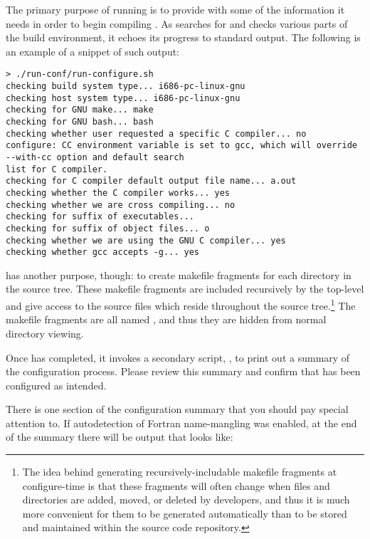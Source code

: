 The primary purpose of running \configure is to provide \make with some of
the information it needs in order to begin compiling \libflamens.
As \configure searches for and checks various parts of the build environment,
it echoes its progress to standard output.
The following is an example of a snippet of such output:

\begin{Verbatim}[frame=single,framesep=2.5mm,xleftmargin=5mm,commandchars=\\\{\},fontsize=\footnotesize]
> ./run-conf/run-configure.sh 
checking build system type... i686-pc-linux-gnu
checking host system type... i686-pc-linux-gnu
checking for GNU make... make
checking for GNU bash... bash
checking whether user requested a specific C compiler... no
configure: CC environment variable is set to gcc, which will override --with-cc option and default search
list for C compiler.
checking for C compiler default output file name... a.out
checking whether the C compiler works... yes
checking whether we are cross compiling... no
checking for suffix of executables... 
checking for suffix of object files... o
checking whether we are using the GNU C compiler... yes
checking whether gcc accepts -g... yes
\end{Verbatim}

\configure has another purpose, though: to create makefile fragments for each
directory in the source tree.
These makefile fragments are included recursively by the top-level \makefile
and give \make access to the source files which reside throughout the source
tree.\footnote{
The idea behind generating recursively-includable makefile fragments at
configure-time is that these fragments will often change when files and
directories are added, moved, or deleted by \libflame developers, and thus
it is much more convenient for them to be generated automatically than to be
stored and maintained within the source code repository.}
The makefile fragments are all named \fragmentmkns, and thus they are hidden
from normal directory viewing.

Once \configure has completed, it invokes a secondary script, \postconfigurens,
to print out a summary of the configuration process.
Please review this summary and confirm that \libflame has been configured as
intended.

There is one section of the configuration summary that you should pay special
attention to.
If autodetection of Fortran name-mangling was enabled, at the end of the summary
there will be output that looks like:


